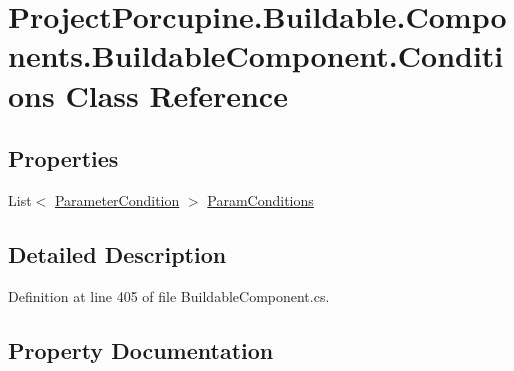 \hypertarget{class_project_porcupine_1_1_buildable_1_1_components_1_1_buildable_component_1_1_conditions}{}\section{Project\+Porcupine.\+Buildable.\+Components.\+Buildable\+Component.\+Conditions Class Reference}
\label{class_project_porcupine_1_1_buildable_1_1_components_1_1_buildable_component_1_1_conditions}
\subsection*{Properties}
\begin{DoxyCompactItemize}
\item 
List$<$ \hyperlink{class_project_porcupine_1_1_buildable_1_1_components_1_1_buildable_component_1_1_parameter_condition}{Parameter\+Condition} $>$ \hyperlink{class_project_porcupine_1_1_buildable_1_1_components_1_1_buildable_component_1_1_conditions_ab6ad52d8a2a19ee554e556a04105fc9a}{Param\+Conditions}
\end{DoxyCompactItemize}


\subsection{Detailed Description}


Definition at line 405 of file Buildable\+Component.\+cs.



\subsection{Property Documentation}
\mbox{\label{class_project_porcupine_1_1_buildable_1_1_components_1_1_buildable_component_1_1_conditions_ab6ad52d8a2a19ee554e556a04105fc9a}} 
